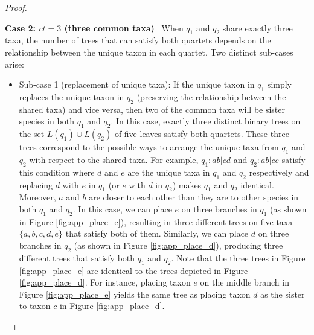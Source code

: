 \documentclass[runningheads]{llncs}
\newcommand{\add}[1]{{\color{blue} #1}}
\newcommand{\addb}[1]{{\color{red} #1}}
\begin{document}
\begin{appendices}
\begin{proof}
\begin{itemize}
\begin{itemize}
\begin{itemize}
\end{itemize}
\end{itemize}




\textbf{Case 2: $ct = 3$ (three common taxa)} \ When $q_1$ and $q_2$ share exactly three taxa, the number of trees that can satisfy both quartets depends on the relationship between the unique taxon in each quartet. Two distinct sub-cases arise:

\begin{itemize} \item Sub-case 1 (replacement of unique taxa): If the unique taxon in $q_1$ simply replaces the unique taxon in $q_2$ (preserving the relationship between the shared taxa) and vice versa, then two of the common taxa will be sister species in both $q_1$ and $q_2$. In this case, exactly three distinct binary trees on the set $L(q_1)\cup L(q_2)$ of five leaves satisfy both quartets. These three trees correspond to the possible ways to arrange the unique taxa from $q_1$ and $q_2$ with respect to the shared taxa. For example, $q_1: ab|cd$ and $q_2: ab|ce$ satisfy this condition where $d$ and $e$ are the unique taxa in $q_1$ and $q_2$ respectively and replacing $d$ with $e$ in $q_1$ (or $e$ with $d$ in $q_2$) makes $q_1$ and $q_2$ identical. Moreover, $a$ and $b$ are closer to each other than they are to other species in both $q_1$ and $q_2$. In this case, we can place $e$ on three branches in $q_1$ (as shown in Figure \ref{fig:app_place_e}), resulting in three different trees on five taxa $\{a,b,c,d,e\}$ that satisfy both of them. Similarly, we can place $d$ on three branches in $q_2$ (as shown in Figure \ref{fig:app_place_d}), producing three different trees that satisfy both $q_1$ and $q_2$. Note that the three trees in Figure \ref{fig:app_place_e} are identical to the trees depicted in Figure \ref{fig:app_place_d}. For instance, placing taxon $e$ on the middle branch in Figure \ref{fig:app_place_e} yields the same tree as placing taxon $d$ as the sister to taxon $c$ in Figure \ref{fig:app_place_d}.


\end{itemize}
\end{itemize}
\end{proof}
\end{appendices}
\end{document}
